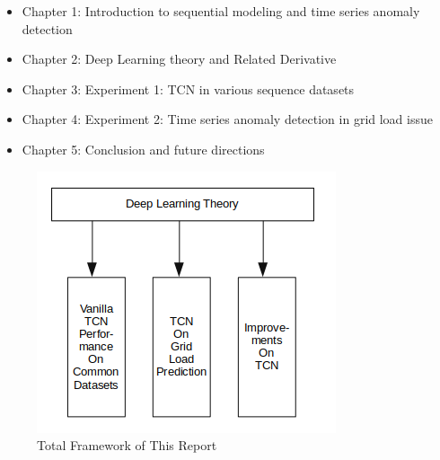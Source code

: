 \begin{itemize}
\item Chapter 1: Introduction to sequential modeling and time series anomaly detection
\item Chapter 2: Deep Learning theory and Related Derivative
\item Chapter 3: Experiment 1: TCN in various sequence datasets
\item Chapter 4: Experiment 2: Time series anomaly detection in grid load issue
\item Chapter 5: Conclusion and future directions
\end{itemize}

\begin{figure}[H]
    \includegraphics[width=\textwidth]{../Figures/total.png}
    \caption{Total Framework of This Report}
    \label{fig:framework}
\end{figure}
